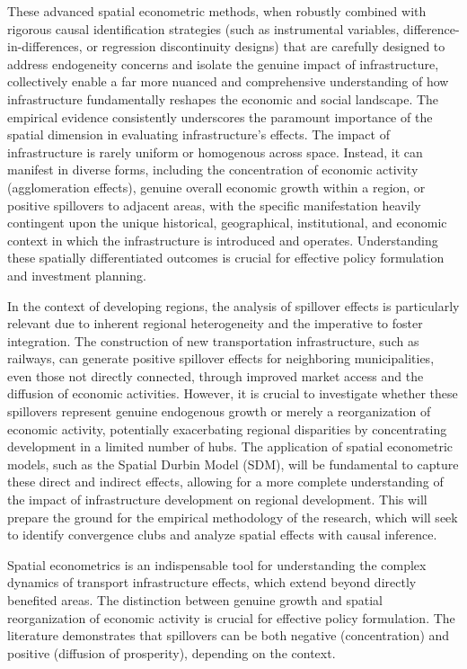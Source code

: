 \documentclass[12pt, a4paper]{article}
\begin{document}
These advanced spatial econometric methods, when robustly combined with rigorous causal identification strategies (such as instrumental variables, difference-in-differences, or regression discontinuity designs) that are carefully designed to address endogeneity concerns and isolate the genuine impact of infrastructure, collectively enable a far more nuanced and comprehensive understanding of how infrastructure fundamentally reshapes the economic and social landscape. The empirical evidence consistently underscores the paramount importance of the spatial dimension in evaluating infrastructure's effects. The impact of infrastructure is rarely uniform or homogenous across space. Instead, it can manifest in diverse forms, including the concentration of economic activity (agglomeration effects), genuine overall economic growth within a region, or positive spillovers to adjacent areas, with the specific manifestation heavily contingent upon the unique historical, geographical, institutional, and economic context in which the infrastructure is introduced and operates. Understanding these spatially differentiated outcomes is crucial for effective policy formulation and investment planning.

In the context of developing regions, the analysis of spillover effects is particularly relevant due to inherent regional heterogeneity and the imperative to foster integration. The construction of new transportation infrastructure, such as railways, can generate positive spillover effects for neighboring municipalities, even those not directly connected, through improved market access and the diffusion of economic activities. However, it is crucial to investigate whether these spillovers represent genuine endogenous growth or merely a reorganization of economic activity, potentially exacerbating regional disparities by concentrating development in a limited number of hubs. The application of spatial econometric models, such as the Spatial Durbin Model (SDM), will be fundamental to capture these direct and indirect effects, allowing for a more complete understanding of the impact of infrastructure development on regional development. This will prepare the ground for the empirical methodology of the research, which will seek to identify convergence clubs and analyze spatial effects with causal inference.

Spatial econometrics is an indispensable tool for understanding the complex dynamics of transport infrastructure effects, which extend beyond directly benefited areas. The distinction between genuine growth and spatial reorganization of economic activity is crucial for effective policy formulation. The literature demonstrates that spillovers can be both negative (concentration) and positive (diffusion of prosperity), depending on the context.
\end{document}
